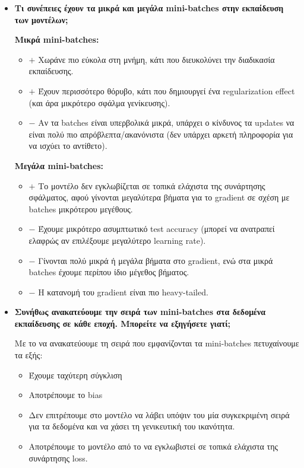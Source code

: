\documentclass[a4paper, 12pt]{article}
\begin{document}
            \begin{itemize}
                \item \textbf{Τι συνέπειες έχουν τα μικρά και μεγάλα mini-batches στην εκπαίδευση των μοντέλων;}
                    
                    \textbf{Μικρά mini-batches:} 
                    \begin{itemize}[label={}]
                        \item $+$ Χωράνε πιο εύκολα στη μνήμη, κάτι που διευκολύνει την διαδικασία εκπαίδευσης.
                        \item $+$ Έχουν περισσότερο θόρυβο, κάτι που δημιουργεί ένα regularization effect (και άρα μικρότερο σφάλμα γενίκευσης).
                        \item $-$ Αν τα batches είναι υπερβολικά μικρά, υπάρχει ο κίνδυνος τα updates να είναι πολύ πιο απρόβλεπτα/ακανόνιστα (δεν υπάρχει αρκετή πληροφορία για να ισχύει το αντίθετο).
                    \end{itemize}
                    
                    \textbf{Μεγάλα mini-batches:}
                    \begin{itemize}[label={}]
                        \item $+$ Το μοντέλο δεν εγκλωβίζεται σε τοπικά ελάχιστα της συνάρτησης σφάλματος, αφού γίνονται μεγαλύτερα βήματα για το gradient σε σχέση με batches μικρότερου μεγέθους.
                        \item $-$ Έχουμε μικρότερο ασυμπτωτικό test accuracy (μπορεί να ανατραπεί ελαφρώς αν επιλέξουμε μεγαλύτερο learning rate).
                        \item $-$ Γίνονται πολύ μικρά ή μεγάλα βήματα στο gradient, ενώ στα μικρά batches έχουμε περίπου ίδιο μέγεθος βήματος.
                        \item $-$ Η κατανομή του gradient είναι πιο heavy-tailed.
                    \end{itemize}
                
                \item \textbf{Συνήθως ανακατεύουμε την σειρά των mini-batches στα δεδομένα εκπαίδευσης σε κάθε εποχή. Μπορείτε να εξηγήσετε γιατί;}
                    
                    Με το να ανακατεύουμε τη σειρά που εμφανίζονται τα mini-batches πετυχαίνουμε τα εξής:
                    
                    \begin{itemize}
                        \item Έχουμε ταχύτερη σύγκλιση
                        \item Αποτρέπουμε το bias
                        \item Δεν επιτρέπουμε στο μοντέλο να λάβει υπόψιν του μία συγκεκριμένη σειρά για τα δεδομένα και να χάσει τη γενικευτική του ικανότητα.
                        \item Αποτρέπουμε το μοντέλο από το να εγκλωβιστεί σε τοπικά ελάχιστα της συνάρτησης loss.
                    \end{itemize}
            \end{itemize}
            
\end{document}
